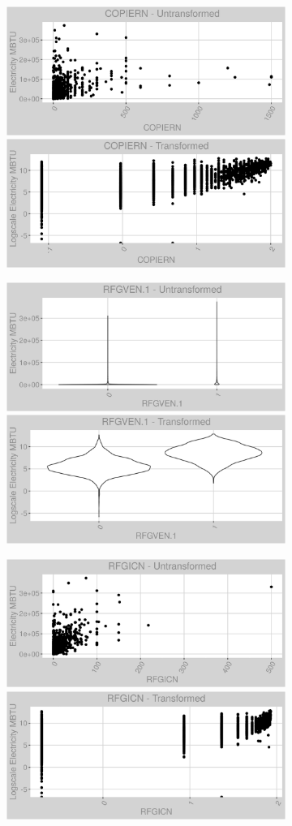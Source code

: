 \newpage
\begin{figure}
\centering
\begin{subfigure}{1\textwidth}
\centering
\includegraphics[width=.49\textwidth, height=0.3\textheight]{Images/electricity_var_original_2.png}
\includegraphics[width=.49\textwidth, height=0.3\textheight]{Images/electricity_var_transformed_2.png}
\centering
\end{subfigure}
\begin{subfigure}{1\textwidth}
\centering
\includegraphics[width=.49\textwidth, height=0.3\textheight]{Images/electricity_var_original_3.png}
\includegraphics[width=.49\textwidth, height=0.3\textheight]{Images/electricity_var_transformed_3.png}
\end{subfigure}
\begin{subfigure}{1\textwidth}
\centering
\includegraphics[width=.49\textwidth, height=0.3\textheight]{Images/electricity_var_original_4.png}
\includegraphics[width=.49\textwidth, height=0.3\textheight]{Images/electricity_var_transformed_4.png}
\end{subfigure}
\end{figure}
